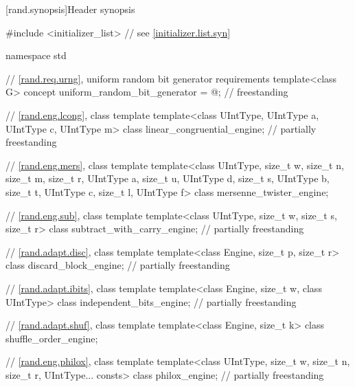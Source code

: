 

[rand.synopsis]{Header  synopsis}


\begin{codeblock}
#include <initializer_list>     // see \ref{initializer.list.syn}

namespace std {
  // \ref{rand.req.urng}, uniform random bit generator requirements
  template<class G>
    concept uniform_random_bit_generator = @\seebelow@;           // freestanding

  // \ref{rand.eng.lcong}, class template 
  template<class UIntType, UIntType a, UIntType c, UIntType m>
    class linear_congruential_engine;                           // partially freestanding

  // \ref{rand.eng.mers}, class template 
  template<class UIntType, size_t w, size_t n, size_t m, size_t r,
           UIntType a, size_t u, UIntType d, size_t s,
           UIntType b, size_t t,
           UIntType c, size_t l, UIntType f>
    class mersenne_twister_engine;

  // \ref{rand.eng.sub}, class template 
  template<class UIntType, size_t w, size_t s, size_t r>
    class subtract_with_carry_engine;                           // partially freestanding

  // \ref{rand.adapt.disc}, class template 
  template<class Engine, size_t p, size_t r>
    class discard_block_engine;                                 // partially freestanding

  // \ref{rand.adapt.ibits}, class template 
  template<class Engine, size_t w, class UIntType>
    class independent_bits_engine;                              // partially freestanding

  // \ref{rand.adapt.shuf}, class template 
  template<class Engine, size_t k>
    class shuffle_order_engine;

  // \ref{rand.eng.philox}, class template 
  template<class UIntType, size_t w, size_t n, size_t r, UIntType... consts>
    class philox_engine;                                        // partially freestanding

}
\end{codeblock}
